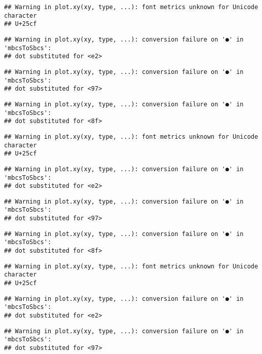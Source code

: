 \documentclass[
]{article}
\begin{document}
\begin{verbatim}
## Warning in plot.xy(xy, type, ...): font metrics unknown for Unicode character
## U+25cf
\end{verbatim}

\begin{verbatim}
## Warning in plot.xy(xy, type, ...): conversion failure on '●' in 'mbcsToSbcs':
## dot substituted for <e2>
\end{verbatim}

\begin{verbatim}
## Warning in plot.xy(xy, type, ...): conversion failure on '●' in 'mbcsToSbcs':
## dot substituted for <97>
\end{verbatim}

\begin{verbatim}
## Warning in plot.xy(xy, type, ...): conversion failure on '●' in 'mbcsToSbcs':
## dot substituted for <8f>
\end{verbatim}

\begin{verbatim}
## Warning in plot.xy(xy, type, ...): font metrics unknown for Unicode character
## U+25cf
\end{verbatim}

\begin{verbatim}
## Warning in plot.xy(xy, type, ...): conversion failure on '●' in 'mbcsToSbcs':
## dot substituted for <e2>
\end{verbatim}

\begin{verbatim}
## Warning in plot.xy(xy, type, ...): conversion failure on '●' in 'mbcsToSbcs':
## dot substituted for <97>
\end{verbatim}

\begin{verbatim}
## Warning in plot.xy(xy, type, ...): conversion failure on '●' in 'mbcsToSbcs':
## dot substituted for <8f>
\end{verbatim}

\begin{verbatim}
## Warning in plot.xy(xy, type, ...): font metrics unknown for Unicode character
## U+25cf
\end{verbatim}

\begin{verbatim}
## Warning in plot.xy(xy, type, ...): conversion failure on '●' in 'mbcsToSbcs':
## dot substituted for <e2>
\end{verbatim}

\begin{verbatim}
## Warning in plot.xy(xy, type, ...): conversion failure on '●' in 'mbcsToSbcs':
## dot substituted for <97>
\end{verbatim}
\end{document}
